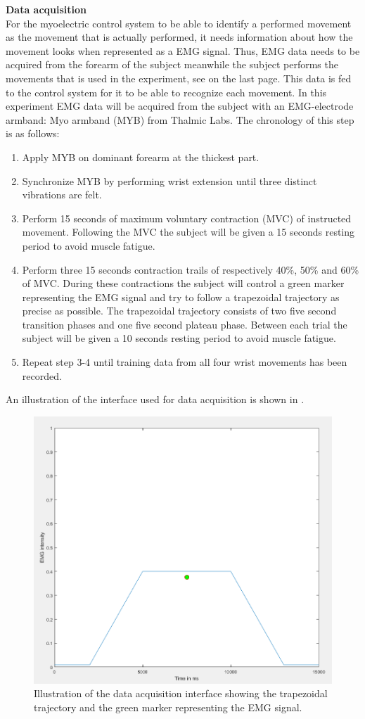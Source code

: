 \textbf{Data acquisition} \\
For the myoelectric control system to be able to identify a performed movement as the movement that is actually performed, it needs information about how the movement looks when represented as a EMG signal. Thus, EMG data needs to be acquired from the forearm of the subject meanwhile the subject performs the movements that is used in the experiment, see  on the last page. This data is fed to the control system for it to be able to recognize each movement. In this experiment EMG data will be acquired from the subject with an EMG-electrode armband: Myo armband (MYB) from Thalmic Labs. The chronology of this step is as follows:

\begin{enumerate}
	\item Apply MYB on dominant forearm at the thickest part.
	\item Synchronize MYB by performing wrist extension until three distinct vibrations are felt.
	\item Perform 15 seconds of maximum voluntary contraction (MVC) of instructed movement. Following the MVC the subject will be given a 15 seconds resting period to avoid muscle fatigue.
	\item Perform three 15 seconds contraction trails of respectively 40\%, 50\% and 60\% of MVC. During these contractions the subject will control a green marker representing the EMG signal and try to follow a trapezoidal trajectory as precise as possible. The trapezoidal trajectory consists of two five second transition phases and one five second plateau phase. Between each trial the subject will be given a 10 seconds resting period to avoid muscle fatigue.
	\item Repeat step 3-4 until training data from all four wrist movements has been recorded.
\end{enumerate}

An illustration of the interface used for data acquisition is shown in .

\begin{figure}[H]                 
	\includegraphics[width=.6\textwidth]{figures/xBackground/dataacqGUI}  
	\caption{Illustration of the data acquisition interface showing the trapezoidal trajectory and the green marker representing the EMG signal.}
	\label{fig:dataacqGUI} 
\end{figure}

